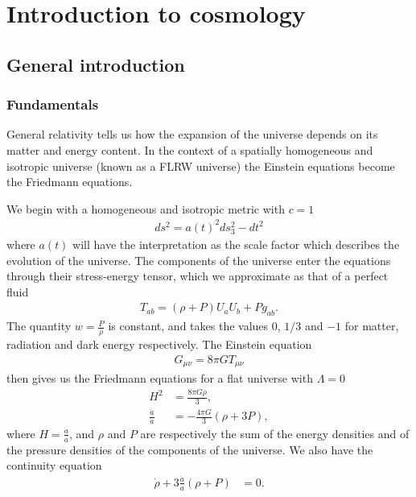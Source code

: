 %
\chapter{Introduction to cosmology}\label{chapter:intro_general}
\section{General introduction}\label{sec:general_intro}
    \subsection{Fundamentals}
    General relativity tells us how the expansion of the universe depends
    on its matter and energy content.
    In the context of a spatially homogeneous and isotropic universe
    (known as a FLRW universe)
    the Einstein equations become the Friedmann equations.


    We begin with a homogeneous and isotropic metric with $c=1$
    \begin{align}
        ds^2 = a(t)^2 ds_3^2 - dt^2
    \end{align}
    where $a(t)$ will have the interpretation as the scale factor
    which describes the evolution of the universe.
    The components of the universe enter the equations through
    their stress-energy tensor, which we approximate as that of
    a perfect fluid
    \begin{align}
        T_{ab} = (\rho+P)U_aU_b+Pg_{ab}.
    \end{align}
    The quantity $w=\frac{P}{\rho}$ is constant,
    and takes the values $0$, $1/3$ and $-1$ for matter, radiation
    and dark energy respectively.
    The Einstein equation
    \begin{align}
        G_{\mu\nu} = 8\pi G T_{\mu\nu}
    \end{align}
    then gives us the Friedmann equations
    for a flat universe with $\Lambda=0$
    \begin{align}
        H^2 &= \frac{8\pi G \rho}{3},\\
        \frac{\ddot{a}}{a} &= -\frac{4\pi G}{3}\left(\rho+3P\right),
    \end{align}
    where $H=\frac{\dot{a}}{a}$, and $\rho$ and $P$ are respectively the sum of the
    energy densities and of the pressure densities of the
    components of the universe. We also have the continuity equation
    \begin{align}
        \dot{\rho} + 3\frac{\dot{a}}{a}\left(\rho+P\right) &= 0.
    \end{align}

